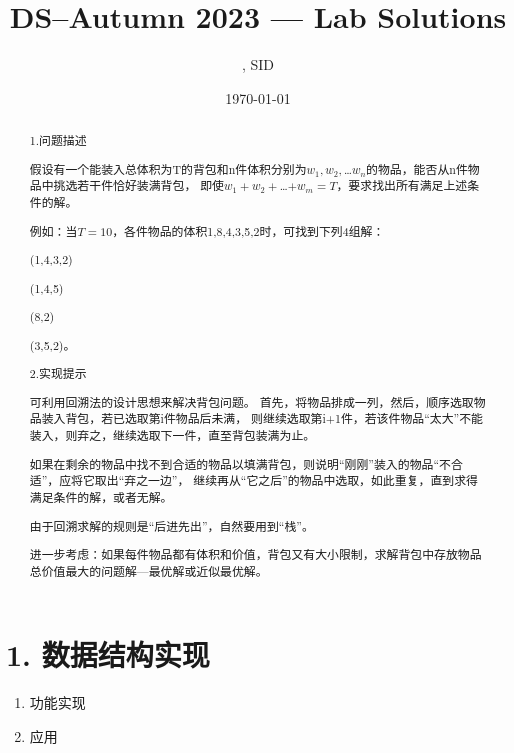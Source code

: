 \documentclass[UTF8]{ctexart}
\title{DS--Autumn 2023 --- Lab \Lab    Solutions} %
\author{\Name, SID \SID} %
\date{\today} %
\newenvironment{qparts}{\begin{enumerate}[{(}a{)}]}{\end{enumerate}} %
\begin{document}
\maketitle


\begin{abstract}
    1.问题描述


    假设有一个能装入总体积为T的背包和n件体积分别为$w_1,w_2,$…$w_n$的物品，能否从n件物品中挑选若干件恰好装满背包，
    即使$w_1+w_2+$…$+w_m=T$，要求找出所有满足上述条件的解。 
   
    例如：当$T=10$，各件物品的体积{1,8,4,3,5,2}时，可找到下列4组解：

     (1,4,3,2)

      (1,4,5)

      (8,2)

      (3,5,2)。

    2.实现提示


    可利用回溯法的设计思想来解决背包问题。
    首先，将物品排成一列，然后，顺序选取物品装入背包，若已选取第i件物品后未满，
    则继续选取第i+1件，若该件物品“太大”不能装入，则弃之，继续选取下一件，直至背包装满为止。

    如果在剩余的物品中找不到合适的物品以填满背包，则说明“刚刚”装入的物品“不合适”，应将它取出“弃之一边”，
    继续再从“它之后”的物品中选取，如此重复，直到求得满足条件的解，或者无解。

    由于回溯求解的规则是“后进先出”，自然要用到“栈”。

    进一步考虑：如果每件物品都有体积和价值，背包又有大小限制，求解背包中存放物品总价值最大的问题解---最优解或近似最优解。


\end{abstract}







\section*{1. 数据结构实现}
\begin{qparts}
    \item 功能实现


    \item 应用 
    
\end{qparts}
\end{document}
